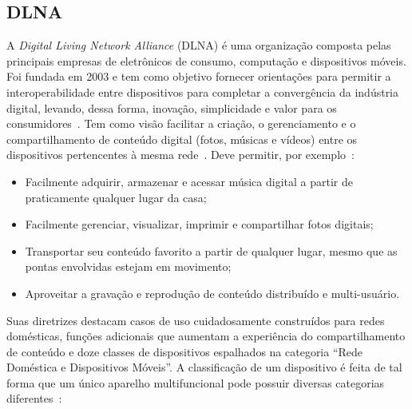 \subsection{DLNA}

A \emph{Digital Living Network Alliance} (DLNA) é uma organização composta pelas principais empresas de eletrônicos de consumo, computação e dispositivos móveis. Foi fundada em 2003 e tem como objetivo fornecer orientações para permitir a interoperabilidade entre dispositivos para completar a convergência da indústria digital, levando, dessa forma, inovação, simplicidade e valor para os consumidores~\cite{dlnaoverview}. Tem como visão facilitar a criação, o gerenciamento e o compartilhamento de conteúdo digital (fotos, músicas e vídeos) entre os dispositivos pertencentes à mesma rede~\cite{dlnahdvideostreaming}. Deve permitir, por exemplo~\cite{dlnaoverview}:

\begin{itemize}
	\item Facilmente adquirir, armazenar e acessar música digital a partir de praticamente qualquer lugar da casa;
	\item Facilmente gerenciar, visualizar, imprimir e compartilhar fotos digitais;
	\item Transportar seu conteúdo favorito a partir de qualquer lugar, mesmo que as pontas envolvidas estejam em movimento;
	\item Aproveitar a gravação e reprodução de conteúdo distribuído e multi-usuário.
\end{itemize}

Suas diretrizes destacam casos de uso cuidadosamente construídos para redes domésticas, funções adicionais que aumentam a experiência do compartilhamento de conteúdo e doze classes de dispositivos espalhados na categoria ``Rede Doméstica e Dispositivos Móveis''. A classificação de um dispositivo é feita de tal forma que um único aparelho multifuncional pode possuir diversas categorias diferentes~\cite{dlnahdvideostreaming, dlnaclasses}:

